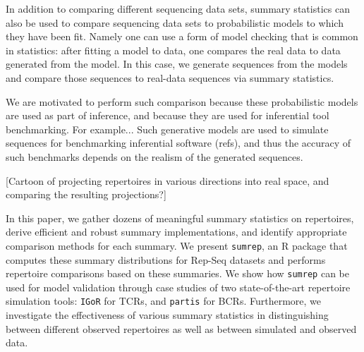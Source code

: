 \documentclass{article}
\begin{document}
In addition to comparing different sequencing data sets, summary statistics can also be used to compare sequencing data sets to probabilistic models to which they have been fit.
Namely one can use a form of model checking that is common in statistics: after fitting a model to data, one compares the real data to data generated from the model.
In this case, we generate sequences from the models and compare those sequences to real-data sequences via summary statistics.

We are motivated to perform such comparison because these probabilistic models are used as part of inference, and because they are used for inferential tool benchmarking.
For example...
Such generative models are used to simulate sequences for benchmarking inferential software (refs), and thus the accuracy of such benchmarks depends on the realism of the generated sequences.


[Cartoon of projecting repertoires in various directions into real space, and comparing the resulting projections?]

In this paper, we gather dozens of meaningful summary statistics on repertoires, derive efficient and robust summary implementations, and identify appropriate comparison methods for each summary.
We present \texttt{sumrep}, an R package that computes these summary distributions for Rep-Seq datasets and performs repertoire comparisons based on these summaries.
We show how \texttt{sumrep} can be used for model validation through case studies of two state-of-the-art repertoire simulation tools: \texttt{IGoR} \cite{Marcou2018-du} for TCRs, and \texttt{partis} \cite{Ralph2016-nw, Ralph2016-iz} for BCRs.
Furthermore, we investigate the effectiveness of various summary statistics in distinguishing between different observed repertoires as well as between simulated and observed data.
\end{document}
